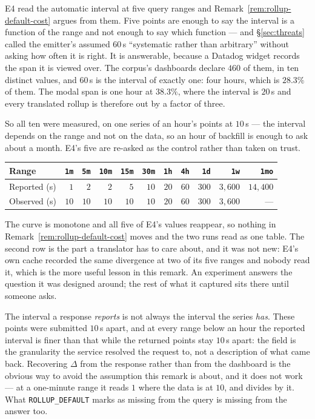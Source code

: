 \begin{remark}%
\label{rem:rollup-spans}
E4 read the automatic interval at five query ranges and
Remark~\ref{rem:rollup-default-cost} argues from them. Five points are enough to say the
interval is a function of the range and not enough to say which function --- and
\S\ref{sec:threats} called the emitter's assumed $60$\,s ``systematic rather than
arbitrary'' without asking how often it is right. It is answerable, because a Datadog
widget records the span it is viewed over. The corpus's dashboards declare $460$ of
them, in ten distinct values, and $60$\,s is the interval of exactly one:
four hours, which is $28.3\%$ of them. The modal span is one hour at $38.3\%$, where the
interval is $20$\,s and every translated rollup is therefore out by a factor of three.

So all ten were measured, on one series of an hour's points at $10$\,s --- the interval
depends on the range and not on the data, so an hour of backfill is enough to ask about
a month. E4's five are re-asked as the control rather than taken on trust.

\begin{center}\footnotesize
\begin{tabular}{@{}lrrrrrrrrrr@{}}
\toprule
Range & \texttt{1m} & \texttt{5m} & \texttt{10m} & \texttt{15m} & \texttt{30m}
      & \texttt{1h} & \texttt{4h} & \texttt{1d} & \texttt{1w} & \texttt{1mo} \\
\midrule
Reported (s) & $1$ & $2$ & $2$ & $5$ & $10$ & $20$ & $60$ & $300$ & $3{,}600$
             & $14{,}400$ \\
Observed (s) & $10$ & $10$ & $10$ & $10$ & $10$ & $20$ & $60$ & $300$ & $3{,}600$
             & --- \\
\bottomrule
\end{tabular}
\end{center}

\noindent
The curve is monotone and all five of E4's values reappear, so nothing in
Remark~\ref{rem:rollup-default-cost} moves and the two runs read as one table. The
second row is the part a translator has to care about, and it was not new: E4's own
cache recorded the same divergence at two of its five ranges and nobody read it, which
is the more useful lesson in this remark. An experiment answers the question it was
designed around; the rest of what it captured sits there until someone asks.

The interval a response \emph{reports} is not always the interval the series \emph{has}.
These points were submitted $10$\,s apart, and at every range below an hour the reported
interval is finer than that while the returned points stay $10$\,s apart: the field is
the granularity the service resolved the request to, not a description of what came
back. Recovering $\Delta$ from the response rather than from the dashboard is the
obvious way to avoid the assumption this remark is about, and it does not work --- at a
one-minute range it reads $1$ where the data is at $10$, and divides by it. What
\texttt{ROLLUP\_DEFAULT} marks as missing from the query is missing from the answer too.


\end{remark}
